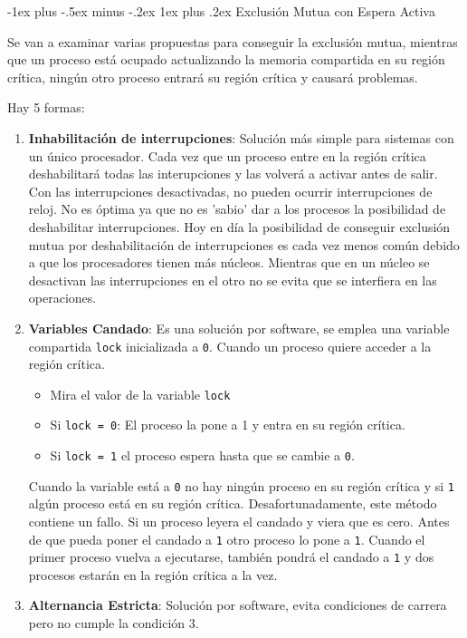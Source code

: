 \documentclass[10pt,portrait, twocolumn]{article}
\makeatletter
\renewcommand{\subsubsection}{\@startsection{subsubsection}{3}{0mm}%
                                {-1ex plus -.5ex minus -.2ex}%
                                {1ex plus .2ex}%
                                {\normalfont\small\bfseries}}
\makeatother
\begin{document}
\subsubsection{Exclusión Mutua con Espera Activa}

Se van a examinar varias propuestas para conseguir la exclusión mutua, mientras que un proceso está ocupado actualizando la memoria compartida en su región crítica, ningún otro proceso entrará su región crítica y causará problemas.

	\quad Hay 5 formas:

	\begin{enumerate}
		\item \textbf{Inhabilitación de interrupciones}: Solución más simple para sistemas con un único procesador. Cada vez que un proceso entre en la región crítica deshabilitará todas las interupciones y las volverá a activar antes de salir. Con las interrupciones desactivadas, no pueden ocurrir interrupciones de reloj.  No es óptima ya que no es 'sabio' dar a los procesos la posibilidad de deshabilitar interrupciones. Hoy en día la posibilidad de conseguir exclusión mutua por deshabilitación de interrupciones es cada vez menos común debido a que los procesadores tienen más núcleos. Mientras que en un núcleo se desactivan las interrupciones en el otro no se evita que se interfiera en las operaciones.
		\item \textbf{Variables Candado}: Es una solución por software, se emplea una variable compartida \texttt{lock} inicializada a \texttt{0}. Cuando un proceso quiere acceder a la región crítica.
			\begin{itemize}
			\item Mira el valor de la variable \texttt{lock}
			\item Si \texttt{lock = 0}: El proceso la pone a 1 y entra en su región crítica.
			\item Si \texttt{lock = 1} el proceso espera hasta que se cambie a \texttt{0}.
			\end{itemize}
			
			Cuando la variable está a \texttt{0} no hay ningún proceso en su región crítica y si \texttt{1} algún proceso está en su región crítica. Desafortunadamente, este método contiene un fallo. Si un proceso leyera el candado y viera que es cero. Antes de que pueda poner el candado a \texttt{1} otro proceso lo pone a \texttt{1}. Cuando el primer proceso vuelva a ejecutarse, también pondrá el candado a \texttt{1}  y dos procesos estarán en la región crítica a la vez.
		\item \textbf{Alternancia Estricta}: Solución por software, evita condiciones de carrera pero no cumple la condición 3.
		

\end{enumerate}
\end{document}
